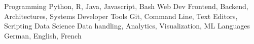 

\begin{cvskills}
	\cvskill
	{Programming} %
	{Python, R, Java, Javascript, Bash} %
	\cvskill
	{Web Dev} %
	{Frontend, Backend, Architectures, Systems} %
	\cvskill
	{Developer Tools} %
	{Git, Command Line, Text Editors, Scripting} %
	\cvskill
	{Data Science} %
	{Data handling, Analytics, Visualization, ML} %
	\cvskill
	{Languages} %
	{German, English, French} %
\end{cvskills}



\begin{cvcourses}
\end{cvcourses}
